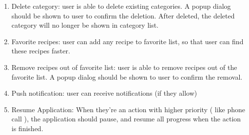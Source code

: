 \documentclass{article}
\begin{document}
\begin{enumerate}
        \item Delete category: user is able to delete existing categories. A popup dialog should be shown to user to confirm the deletion. After deleted, the deleted category will no longer be shown in category list.
        \item Favorite recipes: user can add any recipe to favorite list, so that user can find these recipes faster.
        \item Remove recipes out of favorite list: user is able to remove recipes out of the favorite list. A popup dialog should be shown to user to confirm the removal.
        \item Push notification: user can receive notifications (if they allow)
        \item Resume Application: When they're an action with higher priority ( like phone call ), the application should pause, and resume all progress when the action is finished.
    \end{enumerate}
\end{document}

